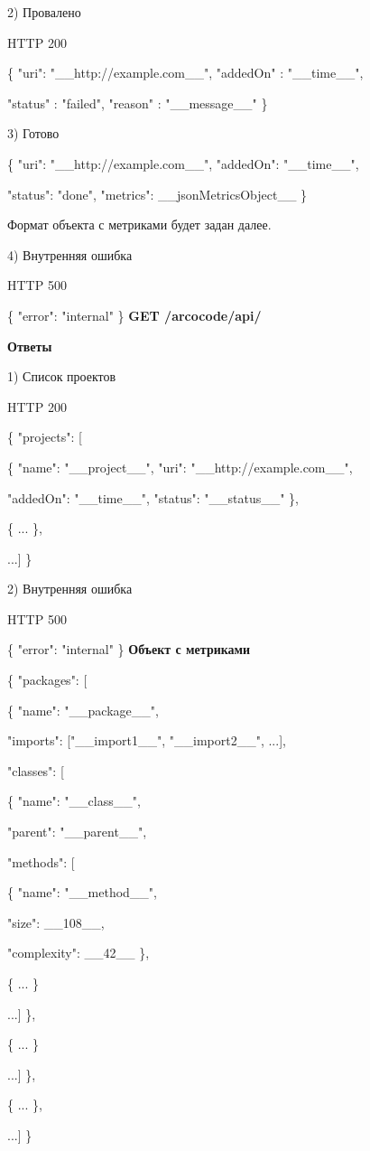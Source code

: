 \documentclass[a4paper,12pt]{article}
\begin{document}
2) Провалено

HTTP 200

\{ "uri": "\_\_http://example.com\_\_", "addedOn" : "\_\_time\_\_", 

"status" : "failed", "reason" : "\_\_message\_\_" \}
\newline

3) Готово

\{ "uri": "\_\_http://example.com\_\_", "addedOn": "\_\_time\_\_", 

"status": "done", "metrics": \_\_jsonMetricsObject\_\_ \}
\newline

Формат объекта с метриками будет задан далее.
\newline

4) Внутренняя ошибка

HTTP 500

\{ "error": "internal" \}
\newpage
\textbf{GET /arcocode/api/}

\textbf{Ответы}
\newline

1) Список проектов

HTTP 200

\{ "projects": [

	\{ "name": "\_\_project\_\_", "uri": "\_\_http://example.com\_\_", 

	"addedOn": "\_\_time\_\_", "status": "\_\_status\_\_" \},

	\{ ... \},

...] \}
\newline

2) Внутренняя ошибка

HTTP 500

\{ "error": "internal" \}
\newpage
\textbf{Объект с метриками}
\newline

\{ "packages": [

	\{ "name": "\_\_package\_\_",

	"imports": ["\_\_import1\_\_", "\_\_import2\_\_", ...],

	"classes": [

		\{ "name": "\_\_class\_\_",

		"parent": "\_\_parent\_\_",

		"methods": [

			\{ "name": "\_\_method\_\_",

			"size": \_\_108\_\_,

			"complexity": \_\_42\_\_ \},

			\{ ... \}

			...] \},

		\{ ... \}

	...] \},

	\{ ... \},

...] \}
\end{document}
